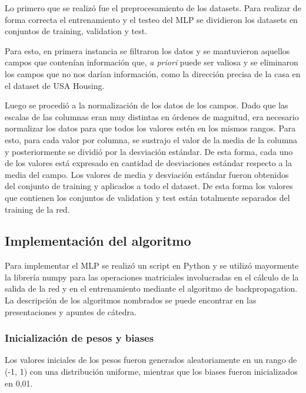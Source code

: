 \documentclass[
]{article}
\begin{document}
Lo primero que se realizó fue el preprocesamiento de los datasets. Para
realizar de forma correcta el entrenamiento y el testeo del MLP se
dividieron los datasets en conjuntos de training, validation y test.

Para esto, en primera instancia se filtraron los datos y se mantuvieron
aquellos campos que contenían información que, \emph{a priori} puede ser
valiosa y se eliminaron los campos que no nos darían información, como
la dirección precisa de la casa en el dataset de USA Housing.

Luego se procedió a la normalización de los datos de los campos. Dado
que las escalas de las columnas eran muy distintas en órdenes de
magnitud, era necesario normalizar los datos para que todos los valores
estén en los mismos rangos. Para esto, para cada valor por columna, se
sustrajo el valor de la media de la columna y posteriormente se dividió
por la desviación estándar. De esta forma, cada uno de los valores está
expresado en cantidad de desviaciones estándar respecto a la media del
campo. Los valores de media y desviación estándar fueron obtenidos del
conjunto de training y aplicados a todo el dataset. De esta forma los
valores que contienen los conjuntos de validation y test están
totalmente separados del training de la red.

\hypertarget{implementaciuxf3n-del-algoritmo}{%
\subsection{Implementación del
algoritmo}\label{implementaciuxf3n-del-algoritmo}}

Para implementar el MLP se realizó un script en Python y se utilizó
mayormente la librería numpy para las operaciones matriciales
involucradas en el cálculo de la salida de la red y en el entrenamiento
mediante el algoritmo de backpropagation. La descripción de los
algoritmos nombrados se puede encontrar en las presentaciones y apuntes
de cátedra.

\hypertarget{inicializaciuxf3n-de-pesos-y-biases}{%
\subsubsection{Inicialización de pesos y
biases}\label{inicializaciuxf3n-de-pesos-y-biases}}

Los valores iniciales de los pesos fueron generados aleatoriamente en un
rango de (-1, 1) con una distribución uniforme, mientras que los biases
fueron inicializados en 0,01.
\end{document}
